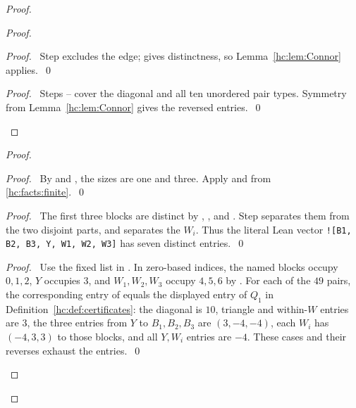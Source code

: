 \begin{mergedproofsection}
\begin{proof}
\begin{proof}
  \begin{proof}\pf\ Step  excludes the edge;
    gives distinctness, so
   Lemma~\ref{hc:lem:Connor} applies.~\qed\end{proof}
  \qedstep
  \begin{proof}\pf\ Steps --
   cover the diagonal and all ten unordered pair types.
   Symmetry from Lemma~\ref{hc:lem:Connor} gives the reversed entries.~\qed\end{proof}
 \end{proof}
 \begin{proof}
  \begin{proof}\pf\ By  and , the sizes
   are one and three. Apply  and
    from \ref{hc:facts:finite}.~\qed\end{proof}
  \begin{proof}\pf\ The first three blocks are distinct by
   , , and .
   Step  separates them from the two disjoint
   parts, and  separates the $W_i$.
   Thus the literal Lean vector \texttt{![B1, B2, B3, Y, W1, W2, W3]}
   has seven distinct entries.~\qed\end{proof}
  \begin{proof}\pf\ Use the fixed list in .
   In zero-based indices, the named blocks occupy $0,1,2$, $Y$ occupies
   $3$, and $W_1,W_2,W_3$ occupy $4,5,6$ by .
   For each of the $49$ pairs, the corresponding entry of
    equals the displayed entry of $Q_1$ in
   Definition~\ref{hc:def:certificates}: the diagonal is $10$,
   triangle and within-$W$ entries are $3$, the three entries from
   $Y$ to $B_1,B_2,B_3$ are $(3,-4,-4)$, each $W_i$ has
   $(-4,3,3)$ to those blocks, and all $Y,W_i$ entries are $-4$.
   These cases and their reverses exhaust the entries.~\qed\end{proof}

\end{proof}
\end{proof}
\end{mergedproofsection}
